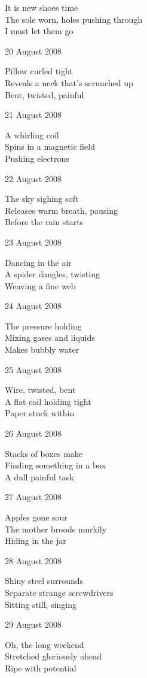 \documentclass[12pt]{article}
\begin{document}
It is new shoes time \\
The sole worn, holes pushing through \\
I must let them go

20 August 2008

Pillow curled tight \\
Reveals a neck that's scrunched up \\
Bent, twisted, painful

21 August 2008

A whirling coil \\
Spins in a magnetic field \\
Pushing electrons

22 August 2008

The sky sighing soft \\
Releases warm breath, pausing \\
Before the rain starts

23 August 2008

Dancing in the air \\
A spider dangles, twisting \\
Weaving a fine web

\newpage

24 August 2008

The pressure holding \\
Mixing gases and liquids \\
Makes bubbly water

25 August 2008

Wire, twisted, bent \\
A flat coil holding tight \\
Paper stuck within

26 August 2008

Stacks of boxes make \\
Finding something in a box \\
A dull painful task

27 August 2008

Apples gone sour \\
The mother broods murkily \\
Hiding in the jar

28 August 2008

Shiny steel surrounds \\
Separate strange screwdrivers \\
Sitting still, singing

29 August 2008

Oh, the long weekend \\
Stretched gloriously ahead \\
Ripe with potential
\end{document}
